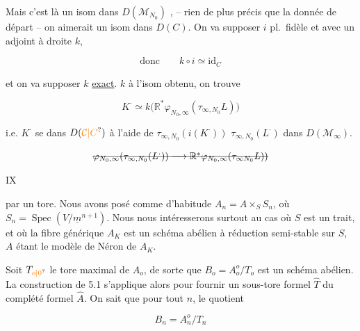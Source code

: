 
Mais c'est là un isom dans $D(\mathcal M_{N_0})$ , -- rien de plus précis que la donnée de départ -- on aimerait un isom dans $D(C)$. On va supposer $i$ pl.\ fidèle et avec un adjoint à droite $k$,

\[
\text{donc}\qquad k\circ i\simeq\mathrm{id}_C
\]

et on va supposer $k$ \uline{exact}.  $k$ à l'isom obtenu, on trouve

\[
K^\cdot\simeq k\bigl(\mathbb R^*\varphi_{N_0,\infty}(\tau_{\infty,N_0}L)\bigr)
\]


i.e. $K^\cdot$ se  dans $D(\unsure{\mathcal C|C})$ à l'aide de $\tau_{\infty,N_0}(i(K^\cdot))$  $\tau_{\infty,N_0}(L^\cdot)$ dans $D(\mathcal M_\infty)$.


\[
\deleted{\varphi_{N_0,\infty}(\tau_{\infty,N_0}(L^\cdot))\longrightarrow\mathbb R^*\varphi_{N_0,\infty}(\tau_{\infty N_0}L))}
\]



\hfill IX

par un tore. Nous avons posé comme d'habitude $A_n=A\times_S S_n$, où $S_n=\operatorname{Spec}(V/\underline m^{n+1})$. Nous nous intéresserons surtout au cas où $S$ est un trait, et où la fibre générique $A_K$ est un schéma abélien à réduction semi-stable sur $S$, $A$ étant le modèle de Néron de $A_K$.

Soit $T_{\unsure{o|0}}$ le tore maximal de $A_o$, de sorte que $B_o=A_o^o/T_o$ est un schéma abélien. La construction de 5.1 s'applique alors pour fournir un sous-tore formel $\hat T$ du complété formel $\hat A$. On sait que pour tout $n$, le quotient

\[
B_n=A_n^o/T_n\tag*{(7.1.1)}
\]

